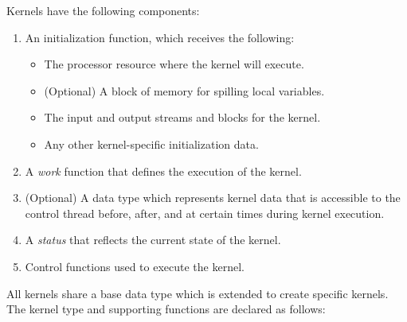 Kernels have the following components:

\begin{enumerate}

\item An initialization function, which receives the following: 
\begin{itemize}
\item The processor resource where the kernel will execute. 
\item (Optional) A block of memory for spilling local variables. 
\item The input and output streams and blocks for the kernel. 
\item Any other kernel-specific initialization data. 
\end{itemize}

\item A {\it work} function that defines the execution of the kernel.

\item (Optional) A data type which represents kernel data that is
accessible to the control thread before, after, and at certain times
during kernel execution.

\item A {\it status} that reflects the current state of the kernel.

\item Control functions used to execute the kernel.

\end{enumerate}


All kernels share a base data type which is extended to create
specific kernels. The kernel type and supporting functions are
declared as follows:

